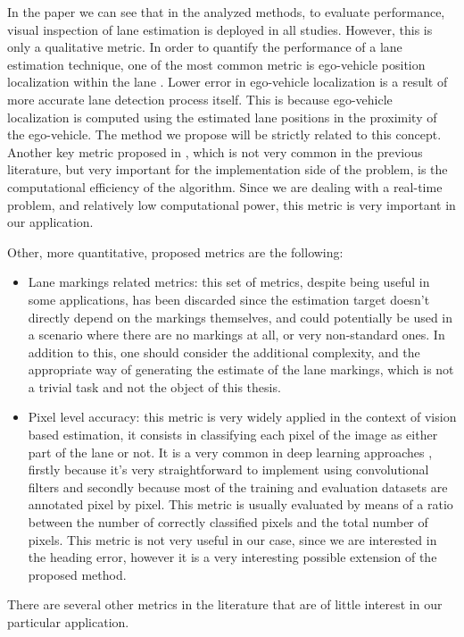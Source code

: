 \documentclass[a4paper,12pt,sort&compress]{article}
\begin{document}
    In the paper \citep*{6977166} we can see that in the analyzed methods, to evaluate performance,
    visual inspection of lane estimation is deployed in all studies. However, this is only a
    qualitative metric. In order to quantify the performance of a lane estimation technique, one of
    the most common metric is ego-vehicle position localization within the lane \citep*{1603550,cheng2007lane,6728507}.
    Lower error in ego-vehicle localization is a result of more accurate lane detection process
    itself. This is because ego-vehicle localization is computed using the estimated lane positions
    in the proximity of the ego-vehicle. The method we propose will be strictly related to this
    concept. Another key metric proposed in \citep*{6977166}, which is not very common in the
    previous literature, but very important for the implementation side of the problem, is the
    computational efficiency of the algorithm. Since we are dealing with a real-time problem, and
    relatively low computational power, this metric is very important in our application.

    Other, more quantitative, proposed metrics are the following:
    \begin{itemize}
        \item Lane markings related metrics: this set of metrics, despite being useful in some
        applications, has been discarded since the estimation target doesn't directly depend on the
        markings themselves, and could potentially be used in a scenario where there are no
        markings at all, or very non-standard ones. In addition to this, one should consider the
        additional complexity, and the appropriate way of generating the estimate of the lane
        markings, which is not a trivial task and not the object of this thesis.
        \item Pixel level accuracy: this metric is very widely applied in the context of vision
        based estimation, it consists in classifying each pixel of the image as either part of the
        lane or not. It is a very common in deep learning approaches \citep*{9398517}, firstly because it's very
        straightforward to implement using convolutional filters and secondly because most of the
        training and evaluation datasets are annotated pixel by pixel. This metric is usually
        evaluated by means of a ratio between the number of correctly classified pixels and the
        total number of pixels. This metric is not very useful in our case, since we are
        interested in the heading error, however it is a very interesting possible extension of the
        proposed method.
    \end{itemize}
    There are several other metrics in the literature that are of little interest in our particular
    application. 
\end{document}
